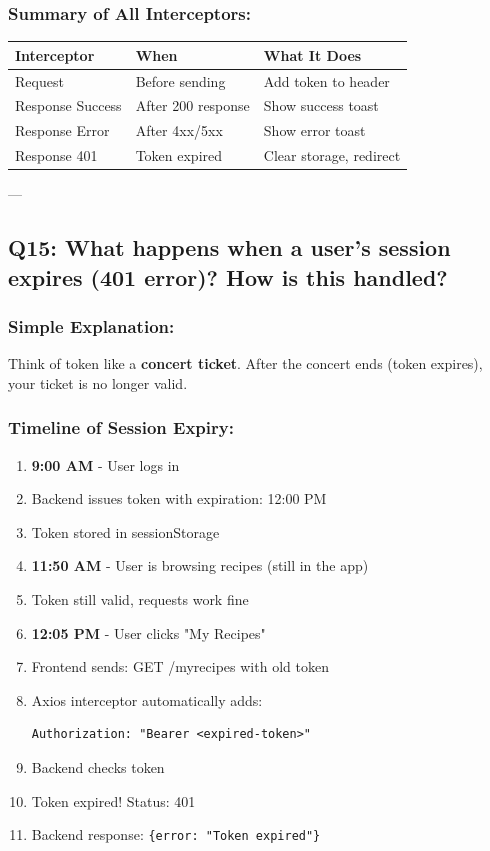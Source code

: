 \documentclass[12pt]{article}
\begin{document}
\subsubsection*{Summary of All Interceptors:}

\begin{center}
\begin{tabular}{|l|l|l|}
\hline
\textbf{Interceptor} & \textbf{When} & \textbf{What It Does} \\
\hline
Request & Before sending & Add token to header \\
Response Success & After 200 response & Show success toast \\
Response Error & After 4xx/5xx & Show error toast \\
Response 401 & Token expired & Clear storage, redirect \\
\hline
\end{tabular}
\end{center}

---

\subsection{Q15: What happens when a user's session expires (401 error)? How is this handled?}

\subsubsection*{Simple Explanation:}

Think of token like a \textbf{concert ticket}. After the concert ends (token expires), your ticket is no longer valid.

\subsubsection*{Timeline of Session Expiry:}

\begin{enumerate}
    \item \textbf{9:00 AM} - User logs in
    \item Backend issues token with expiration: 12:00 PM
    \item Token stored in sessionStorage
    \item \textbf{11:50 AM} - User is browsing recipes (still in the app)
    \item Token still valid, requests work fine
    \item \textbf{12:05 PM} - User clicks "My Recipes"
    \item Frontend sends: GET /myrecipes with old token
    \item Axios interceptor automatically adds:
    \begin{lstlisting}
Authorization: "Bearer <expired-token>"
    \end{lstlisting}
    \item Backend checks token
    \item Token expired! Status: 401
    \item Backend response: \texttt{\{error: "Token expired"\}}
\end{enumerate}
\end{document}
